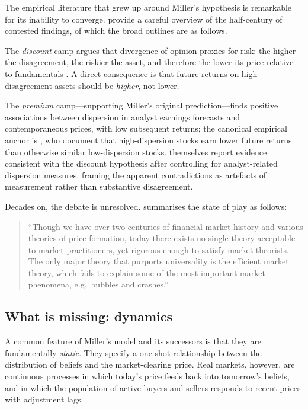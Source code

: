 The empirical literature that grew up around Miller's hypothesis is
remarkable for its inability to converge. \citet{doukas2006} provide a careful
overview of the half-century of contested findings, of which the broad
outlines are as follows.

The \emph{discount} camp argues that divergence of opinion proxies for risk:
the higher the disagreement, the riskier the asset, and therefore the lower
its price relative to fundamentals \citep{williams1977,mayshar1983,
varian1985,merton1987,epsteinwang1994}. A direct consequence is that future
returns on high-disagreement assets should be \emph{higher}, not lower.

The \emph{premium} camp---supporting Miller's original prediction---finds
positive associations between dispersion in analyst earnings forecasts and
contemporaneous prices, with low subsequent returns; the canonical
empirical anchor is \citet{dietherMalloyScherbina2002}, who document
that high-dispersion stocks earn lower future returns than otherwise
similar low-dispersion stocks. \citet{doukas2006}
themselves report evidence consistent with the discount hypothesis after
controlling for analyst-related dispersion measures, framing the apparent
contradictions as artefacts of measurement rather than substantive
disagreement.

Decades on, the debate is unresolved. \citet{moffitt2017} summarises the
state of play as follows:
\begin{quote}
``Though we have over two centuries of financial market history and various
theories of price formation, today there exists no single theory acceptable
to market practitioners, yet rigorous enough to satisfy market theorists.
The only major theory that purports universality is the efficient market
theory, which fails to explain some of the most important market phenomena,
e.g.\ bubbles and crashes.''
\end{quote}

\subsection{What is missing: dynamics}
\label{sec:bg-dynamics}

A common feature of Miller's model and its successors is that they are
fundamentally \emph{static}. They specify a one-shot relationship between the
distribution of beliefs and the market-clearing price. Real markets, however,
are continuous processes in which today's price feeds back into tomorrow's
beliefs, and in which the population of active buyers and sellers responds to
recent prices with adjustment lags.

